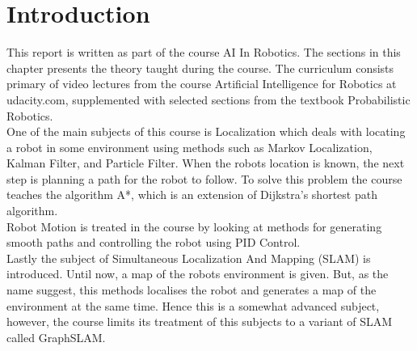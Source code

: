 
\section{Introduction} %
\label{sec:theory_introduction}

This report is written as part of the course AI In Robotics. The sections in this chapter presents the theory taught during the course. The curriculum consists primary of video lectures from the course Artificial Intelligence for Robotics at udacity.com, supplemented with selected sections from the textbook Probabilistic Robotics.\\

One of the main subjects of this course is Localization which deals with locating a robot in some environment using methods such as Markov Localization, Kalman Filter, and Particle Filter. When the robots location is known, the next step is planning a path for the robot to follow. To solve this problem the course teaches the algorithm A*, which is an extension of Dijkstra's shortest path algorithm.\\
Robot Motion is treated in the course by looking at methods for generating smooth paths and controlling the robot using PID Control.\\
Lastly the subject of Simultaneous Localization And Mapping (SLAM) is introduced. Until now, a map of the robots environment is given. But, as the name suggest, this methods localises the robot and generates a map of the environment at the same time. Hence this is a somewhat advanced subject, however, the course limits its treatment of this subjects to a variant of SLAM called GraphSLAM.

